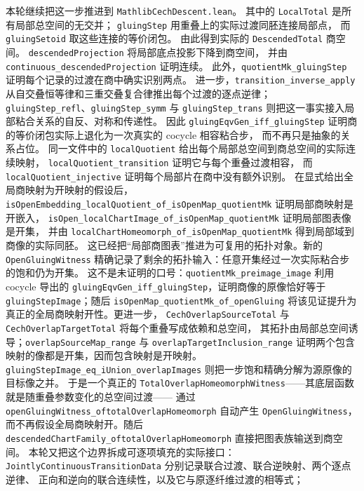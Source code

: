 \documentclass[UTF8,fontset=none,a4paper,11pt]{ctexart}
\begin{document}
本轮继续把这一步推进到 \texttt{MathlibCechDescent.lean}。
其中的 \texttt{LocalTotal} 是所有局部总空间的无交并；
\texttt{gluingStep} 用重叠上的实际过渡同胚连接局部点，
而 \texttt{gluingSetoid} 取这些连接的等价闭包。
由此得到实际的 \texttt{DescendedTotal} 商空间。
\texttt{descendedProjection} 将局部底点投影下降到商空间，
并由 \texttt{continuous\_descendedProjection} 证明连续。
此外，\texttt{quotientMk\_gluingStep} 证明每个记录的过渡在商中确实识别两点。
进一步，\texttt{transition\_inverse\_apply} 从自交叠恒等律和三重交叠复合律推出每个过渡的逐点逆律；
\texttt{gluingStep\_refl}、\texttt{gluingStep\_symm} 与 \texttt{gluingStep\_trans} 则把这一事实接入局部粘合关系的自反、对称和传递性。
因此 \texttt{gluingEqvGen\_iff\_gluingStep} 证明商的等价闭包实际上退化为一次真实的 cocycle 相容粘合步，
而不再只是抽象的关系占位。
同一文件中的 \texttt{localQuotient} 给出每个局部总空间到商总空间的实际连续映射，
\texttt{localQuotient\_transition} 证明它与每个重叠过渡相容，
而 \texttt{localQuotient\_injective} 证明每个局部片在商中没有额外识别。
在显式给出全局商映射为开映射的假设后，
\texttt{isOpenEmbedding\_localQuotient\_of\_isOpenMap\_quotientMk} 证明局部商映射是开嵌入，
\texttt{isOpen\_localChartImage\_of\_isOpenMap\_quotientMk} 证明局部图表像是开集，
并由 \texttt{localChartHomeomorph\_of\_isOpenMap\_quotientMk} 得到局部域到商像的实际同胚。
这已经把“局部商图表”推进为可复用的拓扑对象。新的
\texttt{OpenGluingWitness} 精确记录了剩余的拓扑输入：任意开集经过一次实际粘合步的饱和仍为开集。
这不是未证明的口号：\texttt{quotientMk\_preimage\_image} 利用 cocycle 导出的
\texttt{gluingEqvGen\_iff\_gluingStep}，证明商像的原像恰好等于
\texttt{gluingStepImage}；随后 \texttt{isOpenMap\_quotientMk\_of\_openGluing}
将该见证提升为真正的全局商映射开性。更进一步，
\texttt{CechOverlapSourceTotal} 与 \texttt{CechOverlapTargetTotal} 将每个重叠写成依赖和总空间，
其拓扑由局部总空间诱导；\texttt{overlapSourceMap\_range} 与
\texttt{overlapTargetInclusion\_range} 证明两个包含映射的像都是开集，因而包含映射是开映射。
\texttt{gluingStepImage\_eq\_iUnion\_overlapImages} 则把一步饱和精确分解为源原像的目标像之并。
于是一个真正的 \texttt{TotalOverlapHomeomorph\allowbreak Witness}——其底层函数就是随重叠参数变化的总空间过渡——
通过 \texttt{openGluingWitness\_of\allowbreak totalOverlapHomeomorph} 自动产生
\texttt{OpenGluingWitness}，而不再假设全局商映射开。随后
\texttt{descendedChartFamily\_of\allowbreak totalOverlapHomeomorph} 直接把图表族输送到商空间。
本轮又把这个边界拆成可逐项填充的实际接口：
\texttt{JointlyContinuousTransitionData} 分别记录联合过渡、联合逆映射、两个逐点逆律、
正向和逆向的联合连续性，以及它与原逐纤维过渡的相等式；
\end{document}
